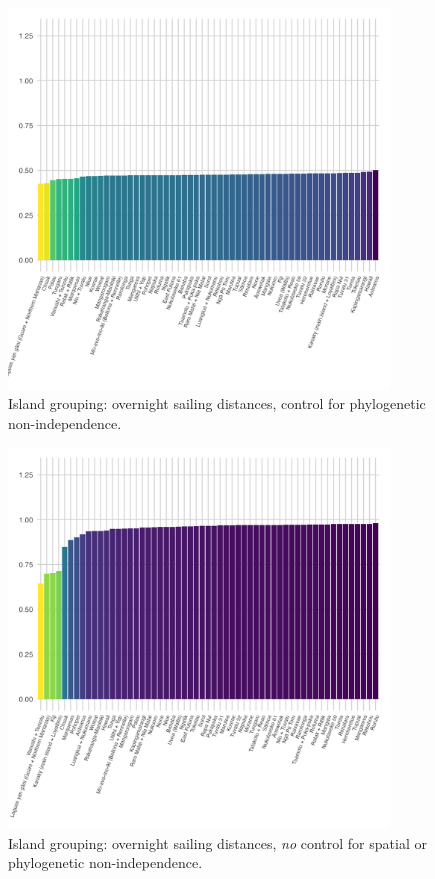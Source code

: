 \documentclass[unnumsec,webpdf,modern,medium]{oup-authoring-template}
\begin{document}
\begin{figure}[ht]
\centering
\includegraphics[width=0.9\textwidth]{brms_SBZR_control_phylo_dropped_out_plot_diff.png}
\caption{Island grouping: overnight sailing distances, control for phylogenetic non-independence.}
\label{appendix_SBZR_control_phylo_dropped_out_plot_diff}
\end{figure}

\begin{figure}[ht]
\centering
\includegraphics[width=0.9\textwidth]{brms_SBZR_control_none_dropped_out_plot_diff.png}
\caption{Island grouping: overnight sailing distances, \emph{no}  control for spatial or phylogenetic non-independence.}
\label{brms_SBZR_control_none_dropped_out_plot_diff}
\end{figure}
\end{document}

